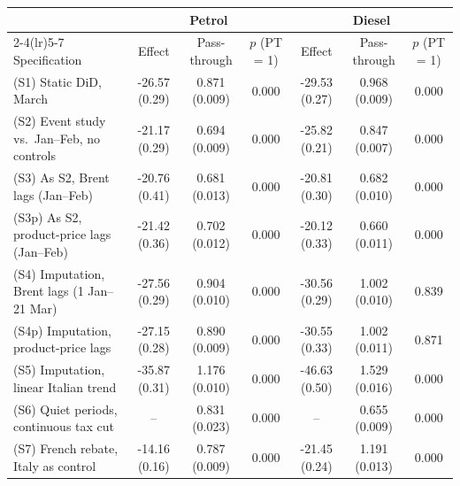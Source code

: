 \begin{tabular}{lcccccc}
\toprule
 & \multicolumn{3}{c}{Petrol} & \multicolumn{3}{c}{Diesel} \\
\cmidrule(lr){2-4}\cmidrule(lr){5-7}
Specification & Effect & Pass-through & \(p\) (PT = 1) & Effect & Pass-through & \(p\) (PT = 1) \\
\midrule
(S1) Static DiD, March & -26.57 (0.29) & 0.871 (0.009) & 0.000 & -29.53 (0.27) & 0.968 (0.009) & 0.000 \\
(S2) Event study vs.\ Jan--Feb, no controls & -21.17 (0.29) & 0.694 (0.009) & 0.000 & -25.82 (0.21) & 0.847 (0.007) & 0.000 \\
(S3) As S2, Brent lags (Jan--Feb) & -20.76 (0.41) & 0.681 (0.013) & 0.000 & -20.81 (0.30) & 0.682 (0.010) & 0.000 \\
(S3p) As S2, product-price lags (Jan--Feb) & -21.42 (0.36) & 0.702 (0.012) & 0.000 & -20.12 (0.33) & 0.660 (0.011) & 0.000 \\
(S4) Imputation, Brent lags (1 Jan--21 Mar) & -27.56 (0.29) & 0.904 (0.010) & 0.000 & -30.56 (0.29) & 1.002 (0.010) & 0.839 \\
(S4p) Imputation, product-price lags & -27.15 (0.28) & 0.890 (0.009) & 0.000 & -30.55 (0.33) & 1.002 (0.011) & 0.871 \\
(S5) Imputation, linear Italian trend & -35.87 (0.31) & 1.176 (0.010) & 0.000 & -46.63 (0.50) & 1.529 (0.016) & 0.000 \\
(S6) Quiet periods, continuous tax cut & -- & 0.831 (0.023) & 0.000 & -- & 0.655 (0.009) & 0.000 \\
(S7) French rebate, Italy as control & -14.16 (0.16) & 0.787 (0.009) & 0.000 & -21.45 (0.24) & 1.191 (0.013) & 0.000 \\
\bottomrule
\end{tabular}

